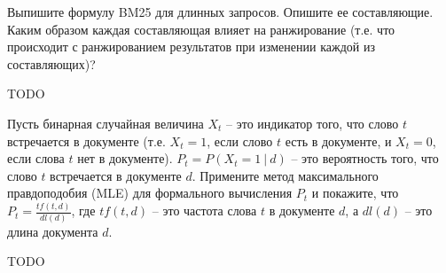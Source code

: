 \begin{task}[6]
Выпишите формулу BM25 для длинных запросов. Опишите ее составляющие.
Каким образом каждая составляющая влияет на ранжирование (т.е. что происходит
с ранжированием результатов при изменении каждой из составляющих)?
\end{task}
\begin{solution}
TODO
\end{solution}

\begin{task}[7]
Пусть бинарная случайная величина $X_t$ – это индикатор того, что слово $t$
встречается в документе (т.е. $X_t = 1$, если слово $t$ есть в документе, и $X_t = 0$, если
слова $t$ нет в документе). $P_t = P(X_t = 1\ |\ d)$ – это вероятность того, что слово $t$
встречается в документе $d$.
Примените метод максимального правдоподобия (MLE) для формального вычисления
$P_t$ и покажите, что $P_t = \frac{tf(t, d)}{dl(d)}$, где $tf(t, d)$ – это частота слова $t$ в документе $d$, а
$dl(d)$ – это длина документа $d$.
\end{task}
\begin{solution}
TODO
\end{solution}

